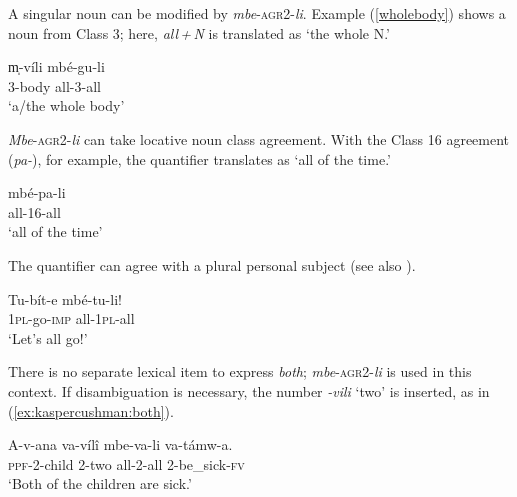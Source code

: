 \documentclass[output=paper,modfonts,nonflat]{langsci/langscibook}
\begin{document}
A singular noun can be modified by \textit{mbe}-\textsc{agr2}-\textit{li}. Example (\ref{wholebody}) shows a noun from Class 3; here, \textit{all\,+\,N} is translated as `the whole N.'

\begin{exe} 

\ex 
\gll m̩-víli mbé-gu-li  \label{wholebody} \\   
3-body all-3-all \\
\glt `a/the whole body' \\  

\end{exe}


\textit{Mbe}-\textsc{agr2}-\textit{li} can take locative noun class agreement. With the Class 16 agreement (\textit{pa-}), for example, the quantifier translates as `all of the time.'

\begin{exe}
\ex 
\gll mbé-pa-li \\
all-16-all \\
\glt `all of the time' \\
\end{exe}


The quantifier can agree with a plural personal subject (see also \citealt{jerro13}).

\begin{exe}   

\ex 
\gll Tu-bít-e mbé-tu-li! \label{subjectagreement} \\
\textsc{1pl}-go-\textsc{imp} all-\textsc{1pl}-all \\  
\glt `Let's all go!'

\end{exe}


There is no separate lexical item to express \textit{both}; \textit{mbe}-\textsc{agr2}-\textit{li} is used in this context.  If disambiguation is necessary, the number \textit{-vili} `two' is inserted, as in (\ref{ex:kaspercushman:both}).

\begin{exe} 

\ex 
\gll A-v-ana va-víl\^i mbe-va-li va-támw-a. \\ 
\textsc{ppf}-2-child 2-two all-2-all 2-be\_sick-\textsc{fv} \\ \label{ex:kaspercushman:both}
\glt `Both of the children are sick.' \\

\end{exe}
\end{document}
